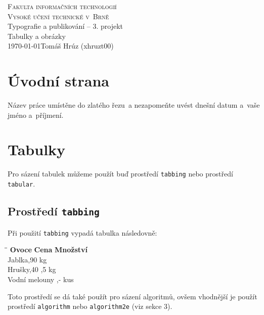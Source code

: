 \documentclass[a4paper,11pt]{article}
\begin{document}
\begin{titlepage}
\begin{center}
\textsc{\Huge Fakulta informačních technologií\\
Vysoké učení technické v~Brně}\\
\LARGE Typografie a publikování -- 3. projekt\\
\Huge{Tabulky a obrázky}\\
\Large \today \hfill         Tomáš Hrúz (xhruzt00)
\newpage
\end{center}
\end{titlepage}

\section{Úvodní strana}
Název práce umístěne do zlatého řezu~a nezapomeňte uvést dnešní datum a~vaše jméno a~příjmení.

\section{Tabulky}
Pro sázení tabulek můžeme použít buď prostředí \verb/tabbing/ nebo prostředí \verb/tabular/.

\subsection{Prostředí \texttt{tabbing}}
Při použití \verb/tabbing/ vypadá tabulka následovně:
\begin{tabbing}
\hspace*{3cm}\=\hspace*{1.5cm}\= \kill
\textbf{Ovoce} \> \textbf{Cena} \> \textbf{Množství} \\
Jablka,90  kg \\
Hrušky,40 ,5 kg \\
Vodní melouny ,-  kus
\end{tabbing}
\bigskip


Toto prostředí se dá také použít pro sázení algoritmů, ovšem vhodnější je použít 
prostředí \verb/algorithm/ nebo \verb/algorithm2e/ (viz sekce 3).
\end{document}

